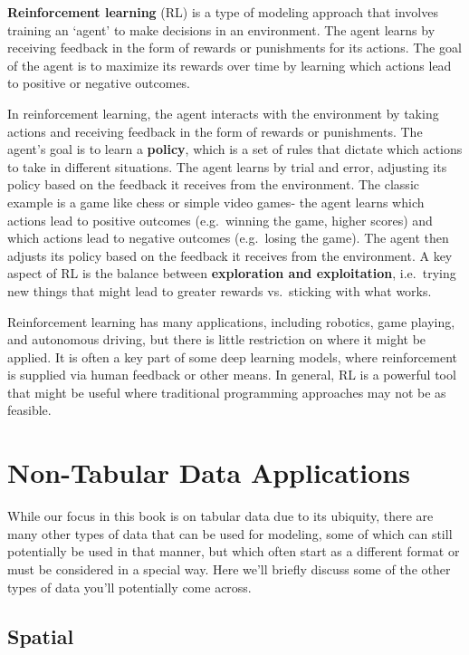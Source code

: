 \documentclass[
  letterpaper,
]{krantz}
\begin{document}
\textbf{Reinforcement learning} (RL) is a type of modeling approach that
involves training an `agent' to make decisions in an environment. The
agent learns by receiving feedback in the form of rewards or punishments
for its actions. The goal of the agent is to maximize its rewards over
time by learning which actions lead to positive or negative outcomes.

In reinforcement learning, the agent interacts with the environment by
taking actions and receiving feedback in the form of rewards or
punishments. The agent's goal is to learn a \textbf{policy}, which is a
set of rules that dictate which actions to take in different situations.
The agent learns by trial and error, adjusting its policy based on the
feedback it receives from the environment. The classic example is a game
like chess or simple video games- the agent learns which actions lead to
positive outcomes (e.g.~winning the game, higher scores) and which
actions lead to negative outcomes (e.g.~losing the game). The agent then
adjusts its policy based on the feedback it receives from the
environment. A key aspect of RL is the balance between
\textbf{exploration and exploitation}, i.e.~trying new things that might
lead to greater rewards vs.~sticking with what works.

Reinforcement learning has many applications, including robotics, game
playing, and autonomous driving, but there is little restriction on
where it might be applied. It is often a key part of some deep learning
models, where reinforcement is supplied via human feedback or other
means. In general, RL is a powerful tool that might be useful where
traditional programming approaches may not be as feasible.

\section{Non-Tabular Data Applications}\label{sec-ml-more-non-tabular}

While our focus in this book is on tabular data due to its ubiquity,
there are many other types of data that can be used for modeling, some
of which can still potentially be used in that manner, but which often
start as a different format or must be considered in a special way. Here
we'll briefly discuss some of the other types of data you'll potentially
come across.

\subsection{Spatial}\label{spatial}
\end{document}

